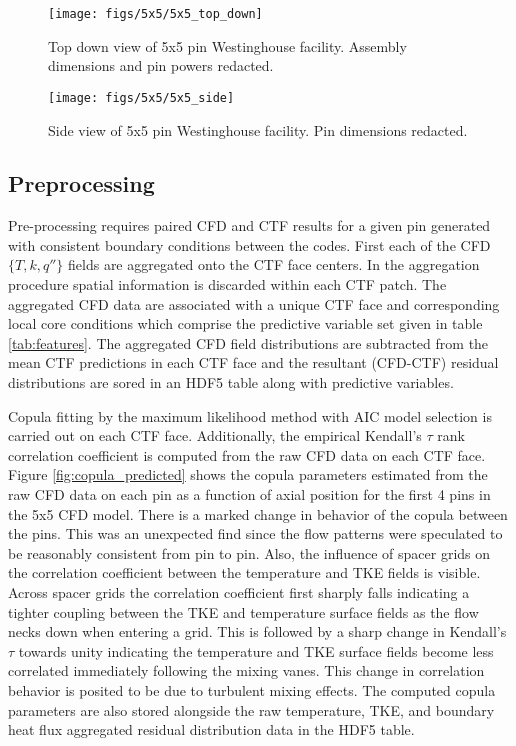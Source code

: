 \begin{figure}[H]
    \centering
    \texttt{[image: figs/5x5/5x5\_top\_down]}
    \caption[Top down view of 5x5 pin Westinghouse facility.]{Top down view of 5x5 pin Westinghouse facility.  Assembly dimensions and pin powers redacted.}
    \label{fig:5x5topdown}
\end{figure}

\begin{figure}[H]
    \centering
    \texttt{[image: figs/5x5/5x5\_side]}
    \caption[Side view of 5x5 pin Westinghouse facility.]{Side view of 5x5 pin Westinghouse facility.  Pin dimensions redacted.}
    \label{fig:5x5side}
\end{figure}


\subsection{Preprocessing}
\label{sec:preprocessing}

Pre-processing requires paired CFD and CTF results for a given pin generated with consistent boundary conditions between the codes.
First each of the CFD $\{T,k,q''\}$ fields are aggregated onto the CTF face centers.  In the aggregation procedure spatial information is discarded within each CTF patch.  The aggregated CFD data are associated with a unique CTF face and corresponding local core conditions which comprise the predictive variable set given in table \ref{tab:features}.  The aggregated CFD field distributions are subtracted from the mean CTF predictions in each CTF face and the resultant (CFD-CTF) residual distributions are sored in an HDF5 table along with predictive variables.

Copula fitting by the maximum likelihood method with AIC model selection is carried out on each CTF face.  Additionally, the empirical Kendall's $\tau$ rank correlation coefficient is computed from the raw CFD data on each CTF face. Figure \ref{fig:copula_predicted} shows the copula parameters estimated from the raw CFD data on each pin as a function of axial position for the first 4 pins in the 5x5 CFD model.  There is a marked change in behavior of the copula between the pins.  This was an unexpected find since the flow patterns were speculated to be reasonably consistent from pin to pin.  Also, the influence of spacer grids on the correlation coefficient between the temperature and TKE fields is visible.  Across spacer grids the correlation coefficient first sharply falls indicating a tighter coupling between the TKE and temperature surface fields as the flow necks down when entering a grid.  This is followed by a sharp change in Kendall's $\tau$ towards unity indicating the temperature and TKE surface fields become less correlated immediately following the mixing vanes.  This change in correlation behavior is posited to be due to turbulent mixing effects.  The computed copula parameters are also stored alongside the raw temperature, TKE, and boundary heat flux aggregated residual distribution data in the HDF5 table.

